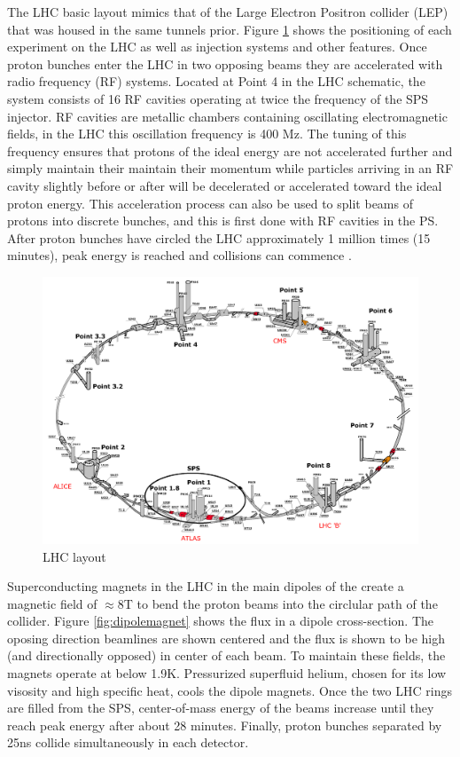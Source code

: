 The LHC basic layout mimics that of the Large Electron Positron collider (LEP) that was housed in the same tunnels prior. Figure \ref{fig:LHClayout} shows the positioning of each experiment on the LHC as well as injection systems and other features. Once proton bunches enter the LHC in two opposing beams they are accelerated with radio frequency (RF) systems. Located at Point 4 in the LHC schematic, the system consists of 16 RF cavities operating at twice the frequency of the SPS injector. RF cavities are metallic chambers containing oscillating electromagnetic fields, in the LHC this oscillation frequency is 400 Mz. The tuning of this frequency ensures that protons of the ideal energy are not accelerated further and simply maintain their maintain their momentum while particles arriving in an RF cavity slightly before or after will be decelerated or accelerated toward the ideal proton energy. This acceleration process can also be used to split beams of protons into discrete bunches, and this is first done with RF cavities in the PS. After proton bunches have circled the LHC approximately 1 million times (15 minutes), peak energy is reached and collisions can commence \cite{radiofrequency}.

\begin{figure}[!h]
        \centering
    \includegraphics[width=.6\textwidth]{Pictures/LHClayout.PNG}
    \caption{LHC layout \cite{LHCref}}
    \label{fig:LHClayout}
\end{figure}

Superconducting magnets in the LHC in the main dipoles of the create a magnetic field of $\approx 8$T to bend the proton beams into the circlular path of the collider. Figure \ref{fig:dipolemagnet} shows the flux in a dipole cross-section. The oposing direction beamlines are shown centered and the flux is shown to be high (and directionally opposed) in center of each beam. To maintain these fields, the magnets operate at below 1.9K. Pressurized superfluid helium, chosen for its low visosity and high specific heat, cools the dipole magnets. Once the two LHC rings are filled from the SPS, center-of-mass energy of the beams increase until they reach peak energy after about 28 minutes. Finally, proton bunches separated by 25ns collide simultaneously in each detector.  

